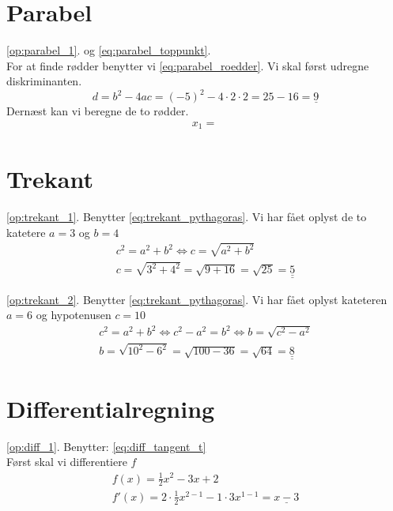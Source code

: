 \documentclass[11pt,a5paper,fleqn,leqno]{book}
\begin{document}
\section{Parabel}

\ref{op:parabel_1}.  og \eqref{eq:parabel_toppunkt}. \\
For at finde rødder benytter vi \eqref{eq:parabel_roedder}. Vi skal først udregne diskriminanten.
\[d = b^2 - 4ac = (-5)^2 - 4 \cdot 2 \cdot 2 = 25 - 16 = \underline{9}\]
Dernæst kan vi beregne de to rødder.
\begin{displaymath}\begin{array}{l}
x_1 = \frac{}{}
\end{array}\end{displaymath}

\section{Trekant}

\ref{op:trekant_1}. Benytter \eqref{eq:trekant_pythagoras}. Vi har fået oplyst de to katetere $a = 3$ og $b = 4$
\begin{displaymath}\begin{array}{l}
c^2 = a^2 + b^2 \Leftrightarrow c = \sqrt{a^2 + b^2} \\
c = \sqrt{3^2 + 4^2} = \sqrt{9 + 16} = \sqrt{25} = \underline{\underline{5}}
\end{array}\end{displaymath}

\ref{op:trekant_2}. Benytter \eqref{eq:trekant_pythagoras}. Vi har fået oplyst kateteren $a = 6$ og hypotenusen $c = 10$
\begin{displaymath}\begin{array}{l}
c^2 = a^2 + b^2 \Leftrightarrow c^2 - a^2 = b^2 \Leftrightarrow b = \sqrt{c^2 - a^2} \\
b = \sqrt{10^2 - 6^2} = \sqrt{100 - 36} = \sqrt{64} = \underline{\underline{8}}
\end{array}\end{displaymath}

\section{Differentialregning}

\ref{op:diff_1}. Benytter: \eqref{eq:diff_tangent_t} \\
Først skal vi differentiere $f$
\begin{displaymath}\begin{array}{l}
f(x) = \frac{1}{2}x^2 - 3x + 2\\
f'(x) = 2 \cdot \frac{1}{2} x^{2-1} - 1 \cdot 3 x^{1-1} = \underline{x - 3}
\end{array}\end{displaymath}
\end{document}
